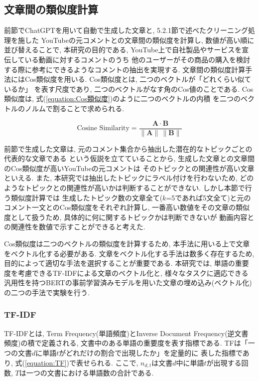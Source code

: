 \documentclass{ltjarticle}
\begin{document}
\newpage
\subsection{文章間の類似度計算}
前節でChatGPTを用いて自動で生成した文章と, 5.2.1節で述べたクリーニング処理を施した
YouTubeの元コメントとの文章間の類似度を計算し, 数値が高い順に並び替えることで, 本研究の目的である, 
YouTube上で自社製品やサービスを宣伝している動画に対するコメントのうち
他のユーザーがその商品の購入を検討する際に参考にできるようなコメントの抽出を実現する. 
文章間の類似度計算手法にはCos類似度を用いる. Cos類似度とは, 二つのベクトルが「どれくらい似ているか」
を表す尺度であり, 二つのベクトルがなす角のCos値のことである. Cos類似度は, 式(\ref{equation:Cos類似度})のように二つのベクトルの内積
を二つのベクトルのノルムで割ることで求められる. 
\vspace{5truept}

\begin{equation}
    \textrm{Cosine\ Similarity} = \dfrac{\boldsymbol{A}\cdot \boldsymbol{B}}{\|\boldsymbol{A}\|\,\|\boldsymbol{B}\|}
    \label{equation:Cos類似度}
\end{equation}
\vspace{5truept}

前節で生成した文章は, 元のコメント集合から抽出した潜在的なトピックごとの代表的な文章である
という仮説を立てていることから, 生成した文章との文章間のCos類似度が高いYouTubeの元コメントは
そのトピックとの関連性が高い文章といえる. また, 本研究では抽出したトピックにラベル付けを行わないため, 
どのようなトピックとの関連性が高いかは判断することができない. しかし本節で行う類似度計算では
生成したトピック数の文章全て($k$=5であれば5文全て)と元のコメント一文とのCos類似度をそれぞれ計算し, 
一番高い数値をその文章の類似度として扱うため, 具体的に何に関するトピックかは判断できないが
動画内容との関連性を数値で示すことができると考えた. 

Cos類似度は二つのベクトルの類似度を計算するため, 本手法に用いる上で文章をベクトル化する必要がある. 
文章をベクトル化する手法は数多く存在するため, 目的によって適切な手法を選択することが重要である. 
本研究では, 単語の重要度を考慮できるTF-IDFによる文章のベクトル化と, 
様々なタスクに適応できる汎用性を持つBERTの事前学習済みモデルを用いた文章の埋め込み(ベクトル化)
の二つの手法で実験を行う. 
\subsubsection{TF-IDF}
TF-IDFとは, Term Frequency(単語頻度)とInverse Document Frequency(逆文書頻度)の積で定義される, 
文書中のある単語の重要度を表す指標である. TFは「一つの文書$d$に単語$t$がどれだけの割合で出現したか」を定量的に
表した指標であり, 式(\ref{equation:TF})で表せられる. ここで, $n_{d,t}$は文書$d$中に単語$t$が出現する回数, $T$は一つの文書における単語数の合計である. 
\vspace{5truept}
\end{document}
